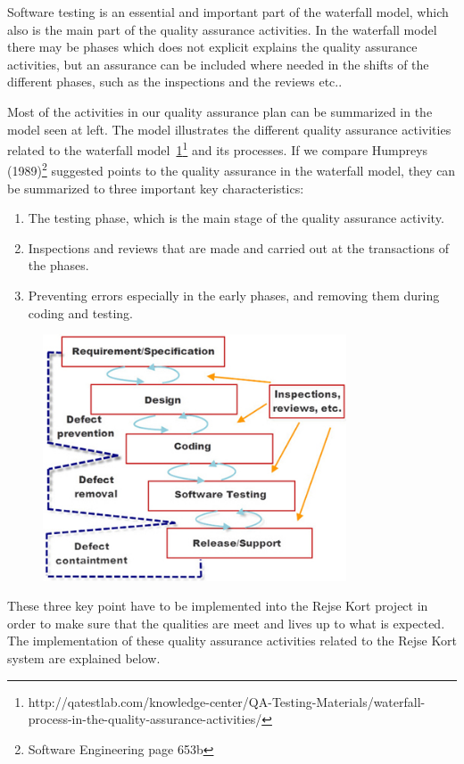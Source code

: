 Software testing is an essential and important part of the waterfall model, which also is the main part of the quality assurance activities. In the waterfall model there may be phases which does not explicit explains the quality assurance activities, but an assurance can be included where needed in the shifts of the different phases, such as the inspections and the reviews etc..



Most of the activities in our quality assurance plan can be summarized in the model seen at left. The model illustrates the different quality assurance activities related to the waterfall model~\ref{model1}\footnote{http://qatestlab.com/knowledge-center/QA-Testing-Materials/waterfall-process-in-the-quality-assurance-activities/
} and its processes. If we compare Humpreys (1989)\footnote{ Software Engineering page 653b} suggested points to the quality assurance in the waterfall model, they can be summarized to three important key characteristics:
\begin{enumerate}
	\item The testing phase, which is the main stage of the quality assurance activity.
	\item Inspections and reviews that are made and carried out at the transactions of the phases.
	\item Preventing errors especially in the early phases, and removing them during coding and testing.
\end{enumerate}

\begin{figure}[ht!]
\centering
\includegraphics[width=90mm]{graphics/model1.png}
\label{model1}
\end{figure}

These three key point have to be implemented into the Rejse Kort project in order to make sure that the qualities are meet and lives up to what is expected. The implementation of these quality assurance activities related to the Rejse Kort system are explained below.


